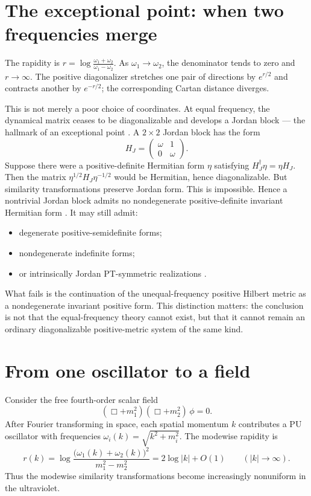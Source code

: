 \documentclass[11pt]{article}
\theoremstyle{remark}
\newcommand{\w}{\omega}
\newcommand{\dg}{\dagger}
\begin{document}
\section{The exceptional point: when two frequencies merge}
\label{sec:exceptional}

The rapidity is $r=\log\frac{\w_1+\w_2}{\w_1-\w_2}$.  As $\w_1\to\w_2$,
the denominator tends to zero and $r\to\infty$.  The positive
diagonalizer stretches one pair of directions by $e^{r/2}$ and contracts
another by $e^{-r/2}$; the corresponding Cartan distance diverges.

This is not merely a poor choice of coordinates.  At equal frequency, the
dynamical matrix ceases to be diagonalizable and develops a Jordan block
--- the hallmark of an exceptional point \cite{Kato,Heiss2012}.  A
$2\times2$ Jordan block has the form
\begin{equation}
H_J=\begin{pmatrix}\w&1\\0&\w\end{pmatrix}.
\end{equation}
Suppose there were a positive-definite Hermitian form $\eta$ satisfying
$H_J^{\dg}\eta=\eta H_J$.  Then the matrix $\eta^{1/2}H_J\eta^{-1/2}$
would be Hermitian, hence diagonalizable.  But similarity transformations
preserve Jordan form.  This is impossible.  Hence a nontrivial Jordan
block admits no nondegenerate positive-definite invariant Hermitian form
\cite{paperI,GLR2005}.  It may still admit:
\begin{itemize}
\item degenerate positive-semidefinite forms;
\item nondegenerate indefinite forms;
\item or intrinsically Jordan PT-symmetric realizations
\cite{BM2008PRD}.
\end{itemize}
What fails is the continuation of the unequal-frequency positive Hilbert
metric as a nondegenerate invariant positive form.  This distinction
matters: the conclusion is not that the equal-frequency theory cannot
exist, but that it cannot remain an ordinary diagonalizable
positive-metric system of the same kind.

\section{From one oscillator to a field}\label{sec:field}

Consider the free fourth-order scalar field
\begin{equation}
(\Box+m_1^2)(\Box+m_2^2)\,\phi=0 .
\end{equation}
After Fourier transforming in space, each spatial momentum $k$
contributes a PU oscillator with frequencies
$\w_i(k)=\sqrt{k^2+m_i^2}$.  The modewise rapidity is
\begin{equation}
r(k)=\log\frac{\big(\w_1(k)+\w_2(k)\big)^2}{m_1^2-m_2^2}
=2\log|k|+O(1)
\qquad(|k|\to\infty).
\end{equation}
Thus the modewise similarity transformations become increasingly
nonuniform in the ultraviolet.
\end{document}
